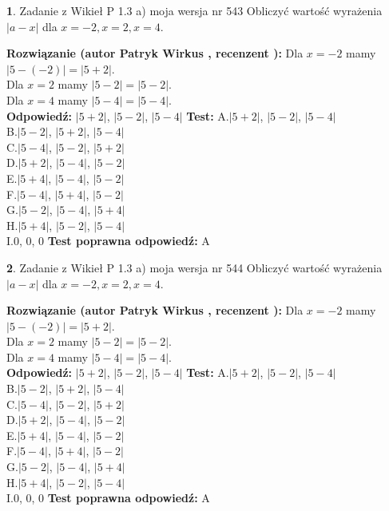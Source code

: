\documentclass[12pt, a4paper]{article}
\theoremstyle{definition} %
\newtheorem{zad}{}
\newcommand{\zadStart}[1]{\begin{zad}#1\newline}
\newcommand{\zadStop}{\end{zad}}
\newcommand{\rozwStart}[2]{\noindent \textbf{Rozwiązanie (autor #1 , recenzent #2): }\newline}
\newcommand{\rozwStop}{\newline}
\newcommand{\odpStart}{\noindent \textbf{Odpowiedź:}\newline}
\newcommand{\odpStop}{\newline}
\newcommand{\testStart}{\noindent \textbf{Test:}\newline}
\newcommand{\testStop}{\newline}
\newcommand{\kluczStart}{\noindent \textbf{Test poprawna odpowiedź:}\newline}
\newcommand{\kluczStop}{\newline}
\begin{document}
\zadStart{Zadanie z Wikieł P 1.3 a) moja wersja nr 543}
Obliczyć wartość wyrażenia $|a - x|$ dla $x=-2,x=2,x=4$.
\zadStop
\rozwStart{Patryk Wirkus}{}
Dla $x = -2$ mamy $|5 - (-2)| = |5 + 2|$.\\
Dla $x = 2$ mamy $|5 - 2| = |5 - 2|$.\\
Dla $x = 4$ mamy $|5 - 4| = |5 - 4|$.\\
\rozwStop
\odpStart
$|5 + 2|$, $|5 - 2|$, $|5 - 4|$
\odpStop
\testStart
A.$|5 + 2|$, $|5 - 2|$, $|5 - 4|$\\
B.$|5 - 2|$, $|5 + 2|$, $|5 - 4|$\\
C.$|5 - 4|$, $|5 - 2|$, $|5 + 2|$\\
D.$|5 + 2|$, $|5 - 4|$, $|5 - 2|$\\
E.$|5 + 4|$, $|5 - 4|$, $|5 - 2|$\\
F.$|5 - 4|$, $|5 + 4|$, $|5 - 2|$\\
G.$|5 - 2|$, $|5 - 4|$, $|5 + 4|$\\
H.$|5 + 4|$, $|5 - 2|$, $|5 - 4|$\\
I.$0$, $0$, $0$
\testStop
\kluczStart
A
\kluczStop



\zadStart{Zadanie z Wikieł P 1.3 a) moja wersja nr 544}
Obliczyć wartość wyrażenia $|a - x|$ dla $x=-2,x=2,x=4$.
\zadStop
\rozwStart{Patryk Wirkus}{}
Dla $x = -2$ mamy $|5 - (-2)| = |5 + 2|$.\\
Dla $x = 2$ mamy $|5 - 2| = |5 - 2|$.\\
Dla $x = 4$ mamy $|5 - 4| = |5 - 4|$.\\
\rozwStop
\odpStart
$|5 + 2|$, $|5 - 2|$, $|5 - 4|$
\odpStop
\testStart
A.$|5 + 2|$, $|5 - 2|$, $|5 - 4|$\\
B.$|5 - 2|$, $|5 + 2|$, $|5 - 4|$\\
C.$|5 - 4|$, $|5 - 2|$, $|5 + 2|$\\
D.$|5 + 2|$, $|5 - 4|$, $|5 - 2|$\\
E.$|5 + 4|$, $|5 - 4|$, $|5 - 2|$\\
F.$|5 - 4|$, $|5 + 4|$, $|5 - 2|$\\
G.$|5 - 2|$, $|5 - 4|$, $|5 + 4|$\\
H.$|5 + 4|$, $|5 - 2|$, $|5 - 4|$\\
I.$0$, $0$, $0$
\testStop
\kluczStart
A
\kluczStop
\end{document}
